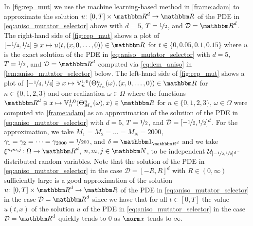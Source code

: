 In \cref{fig:rep_mut} we use the machine learning-based method in \cref{frame:adam} to approximate the solution $u\colon[0,T]\times\R^d\to\R$ of the PDE in \cref{eq:aniso_mutator_selector} above with $d=5$, $T=\nicefrac12$, and $\mathcal D=\R^d$. The right-hand side of \cref{fig:rep_mut} shows a plot of $[-\nicefrac{1}{4}, \nicefrac{1}{4}] \ni x \mapsto u(t, (x, 0,  \dots,0)) \in \R$ for $t\in\{0,0.05,0.1,0.15\}$ where $u$ is the exact solution of the PDE in \cref{eq:aniso_mutator_selector} with $d=5$, $T=\nicefrac12$, and $\mathcal D=\R^d$ computed via \cref{eq:lem_aniso} in \cref{lem:aniso_mutator_selector} below. The left-hand side of \cref{fig:rep_mut} shows a plot of $[-\nicefrac{1}{4}, \nicefrac{1}{4}] \ni x \mapsto \bV_n^{1,0}(\Theta^n_{M_n}(\omega),(x, 0, \dots,0)) \in \R$ for $n\in\{0,1,2,3\}$ and one realization $\omega\in\Omega$ where the functions $\R^d\ni x\mapsto \bV_n^{1,0}(\Theta^n_{M_n}(\omega),x)\in\R$ for $n\in\{0,1,2,3\}$, $\omega\in\Omega$ were computed via \cref{frame:adam} as an approximation of the solution of the PDE in \cref{eq:aniso_mutator_selector} with $d=5$, $T=\nicefrac12$, and $\mathcal D=[-\nicefrac 12,\nicefrac 12]^d$. For the approximation, we take
$M_1=M_2=\ldots=M_N=2000$,
$\gamma_1=\gamma_2=\dots=\gamma_{2000}=\nicefrac{1}{200}$,
and
$\delta=\one_{\R^d}$
and we take
$\xi^{n,m,j}\colon\Omega\to\R^d$, $n, m, j \in \N$,
to be independent $\mathcal{U}_{[-\nicefrac{1}{2},\nicefrac{1}{2}]^d}$-distributed random variables.
Note that the solution of the PDE in \cref{eq:aniso_mutator_selector} in the case $\mathcal D=[-R,R]^d$ with $R\in(0,\infty)$ sufficiently large is a good approximation of the solution $u\colon[0,T]\times \R^d\to\R$ of the PDE in \cref{eq:aniso_mutator_selector} in the case $\mathcal D=\R^d$ since we have that for all $t\in[0,T]$ the value $u(t,x)$ of the solution $u$ of the PDE in \cref{eq:aniso_mutator_selector} in the case $\mathcal D=\R^d$ quickly tends to $0$ as $\norm x$ tends to $\infty$.




